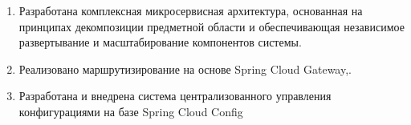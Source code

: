 \begin{enumerate}
  \item Разработана комплексная микросервисная архитектура, основанная на принципах декомпозиции предметной области и обеспечивающая независимое развертывание и масштабирование компонентов системы.
  \item Реализовано маршрутизирование на основе Spring Cloud Gateway,.
  \item Разработана и внедрена система централизованного управления конфигурациями на базе Spring Cloud Config
\end{enumerate}
